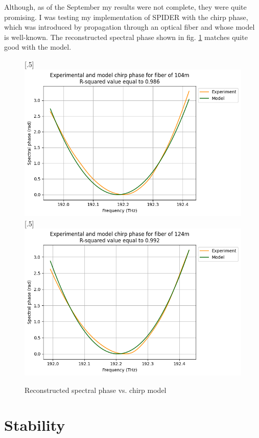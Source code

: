 \documentclass{article}
\begin{document}
Although, as of the September my results were not complete, they were quite promising. I was testing my implementation of SPIDER with the chirp phase, which was introduced by propagation through an optical fiber and whose model is well-known. The reconstructed spectral phase shown in fig. \ref{final phase} matches quite good with the model.

\begin{figure}[h]
\caption{Reconstructed spectral phase vs. chirp model}
[.5\linewidth]{%
\includegraphics[width=\linewidth]{final_20}%
}%
\hfill
{}[.5\linewidth]{%
\includegraphics[width=\linewidth]{final_40}%
}
\label{final phase}
\end{figure}

\section{Stability}
\end{document}
